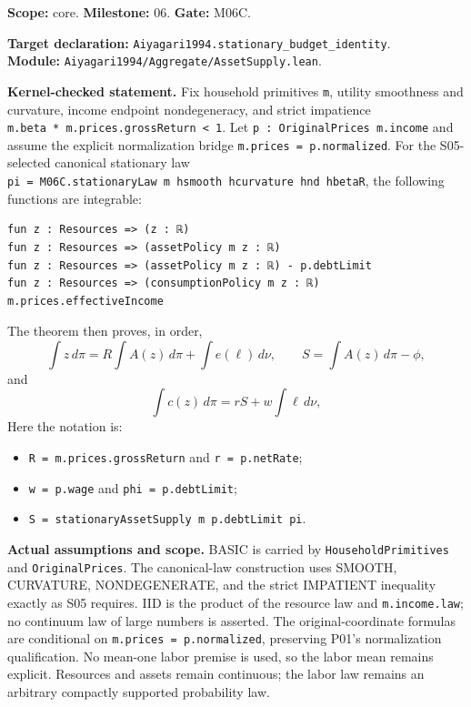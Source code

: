 \documentclass[
  11pt,
]{article}
\providecommand{\tightlist}{%
  \setlength{\itemsep}{0pt}\setlength{\parskip}{0pt}}
\let\LedgerOriginalTexttt\texttt
\renewcommand{\texttt}[1]{{\small\LedgerOriginalTexttt{#1}}}
\begin{document}
\textbf{Scope:} core. \textbf{Milestone:} 06. \textbf{Gate:} M06C.

\textbf{Target declaration:}
\texttt{Aiyagari1994.stationary\_budget\_identity}.\\
\textbf{Module:} \texttt{Aiyagari1994/Aggregate/AssetSupply.lean}.

\textbf{Kernel-checked statement.} Fix household primitives \texttt{m},
utility smoothness and curvature, income endpoint nondegeneracy, and
strict impatience
\texttt{m.beta\ *\ m.prices.grossReturn\ \textless{}\ 1}. Let
\texttt{p\ :\ OriginalPrices\ m.income} and assume the explicit
normalization bridge \texttt{m.prices\ =\ p.normalized}. For the
S05-selected canonical stationary law
\texttt{pi\ =\ M06C.stationaryLaw\ m\ hsmooth\ hcurvature\ hnd\ hbetaR},
the following functions are integrable:

\begin{verbatim}
fun z : Resources => (z : ℝ)
fun z : Resources => (assetPolicy m z : ℝ)
fun z : Resources => (assetPolicy m z : ℝ) - p.debtLimit
fun z : Resources => (consumptionPolicy m z : ℝ)
m.prices.effectiveIncome
\end{verbatim}

The theorem then proves, in order, \[
 \int z\,d\pi
 = R\int A(z)\,d\pi+\int e(\ell)\,d\nu,
 \qquad
 S=\int A(z)\,d\pi-\phi,
\] and \[
 \int c(z)\,d\pi=rS+w\int \ell\,d\nu,
\] Here the notation is:

\begin{itemize}
\tightlist
\item
  \texttt{R\ =\ m.prices.grossReturn} and \texttt{r\ =\ p.netRate};
\item
  \texttt{w\ =\ p.wage} and \texttt{phi\ =\ p.debtLimit};
\item
  \texttt{S\ =\ stationaryAssetSupply\ m\ p.debtLimit\ pi}.
\end{itemize}

\textbf{Actual assumptions and scope.} BASIC is carried by
\texttt{HouseholdPrimitives} and \texttt{OriginalPrices}. The
canonical-law construction uses SMOOTH, CURVATURE, NONDEGENERATE, and
the strict IMPATIENT inequality exactly as S05 requires. IID is the
product of the resource law and \texttt{m.income.law}; no continuum law
of large numbers is asserted. The original-coordinate formulas are
conditional on \texttt{m.prices\ =\ p.normalized}, preserving P01's
normalization qualification. No mean-one labor premise is used, so the
labor mean remains explicit. Resources and assets remain continuous; the
labor law remains an arbitrary compactly supported probability law.
\end{document}
